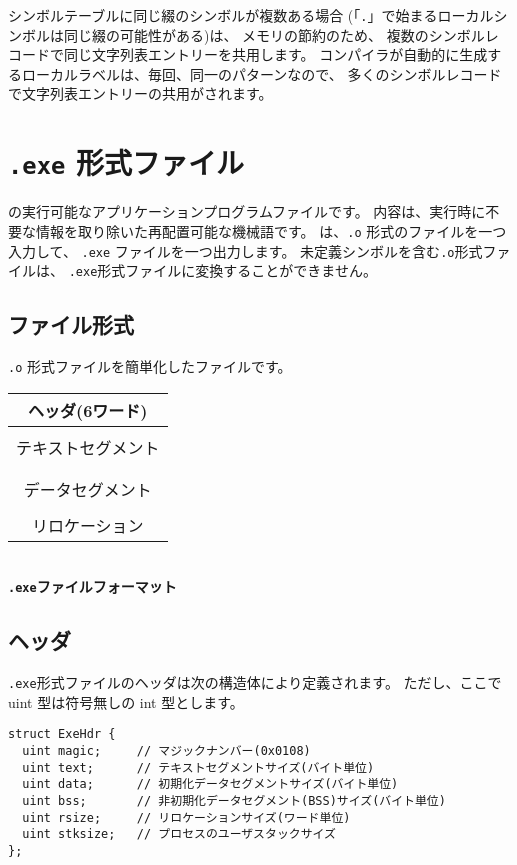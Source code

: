 シンボルテーブルに同じ綴のシンボルが複数ある場合
(「\verb/./」で始まるローカルシンボルは同じ綴の可能性がある)は、
メモリの節約のため、
複数のシンボルレコードで同じ文字列表エントリーを共用します。
\cmm コンパイラが自動的に生成するローカルラベルは、毎回、同一のパターンなので、
多くのシンボルレコードで文字列表エントリーの共用がされます。

\section{{\tt .exe} 形式ファイル}
\label{app:eformat}

\tacos の実行可能なアプリケーションプログラムファイルです。
内容は、実行時に不要な情報を取り除いた再配置可能な機械語です。
{\objexe}は、{\tt .o} 形式のファイルを一つ入力して、
{\tt .exe} ファイルを一つ出力します。
未定義シンボルを含む{\tt .o}形式ファイルは、
{\tt .exe}形式ファイルに変換することができません。

\subsection{ファイル形式}

{\tt .o} 形式ファイルを簡単化したファイルです。

\begin{myminipage}
\begin{tabular}{|c|}
\hline
ヘッダ(6ワード) \\
\hline
\\
テキストセグメント \\
\\
\hline
\\
データセグメント \\
\\
\hline
リロケーション \\
\hline
\end{tabular}
\\\vspace{0.2cm}
{\bf {\tt .exe}ファイルフォーマット}
\end{myminipage}

\subsection{ヘッダ}

{\tt .exe}形式ファイルのヘッダは次の構造体により定義されます。
ただし、ここで uint 型は符号無しの int 型とします。

\begin{mylist}
\begin{verbatim}
struct ExeHdr {
  uint magic;     // マジックナンバー(0x0108)
  uint text;      // テキストセグメントサイズ(バイト単位)
  uint data;      // 初期化データセグメントサイズ(バイト単位)
  uint bss;       // 非初期化データセグメント(BSS)サイズ(バイト単位)
  uint rsize;     // リロケーションサイズ(ワード単位)
  uint stksize;   // プロセスのユーザスタックサイズ
};
\end{verbatim}
\end{mylist}

